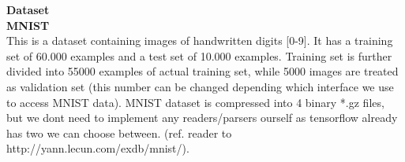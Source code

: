 \documentclass[Report.tex]{subfiles}
\begin{document}
\begin{flushleft}
  \textbf{Dataset} \\
  \textbf{MNIST} \\
  This is a dataset containing images of handwritten digits [0-9]. It has a training set of 60.000 examples and a test set of 10.000 examples. Training set is further divided into 55000 examples of actual training set, while 5000 images are treated as validation set (this number can be changed depending which interface we use to access MNIST data).
MNIST dataset is compressed into 4 binary *.gz files, but we dont need to implement any readers/parsers ourself as tensorflow already has two we can choose between.
(ref. reader to http://yann.lecun.com/exdb/mnist/).
\end{flushleft}
\end{document}
